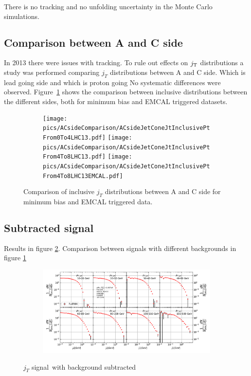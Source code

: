There is no tracking and no unfolding uncertainty in the Monte Carlo simulations. 



\subsection{Comparison between A and C side}
In 2013 there were issues with tracking. To rule out effects on $j_{\rm T}$ distributions a study was performed comparing $j_T$ distributions between A and C side. {\color{red}Which is lead going side and which is proton going} No systematic differences were observed. Figure~\ref{fig:signalbg} shows the comparison between inclusive distributions between the different sides, both for minimum bias and EMCAL triggered datasets.

\begin{figure}
\centering
\begin{subfigure}{0.95\textwidth}
\texttt{[image: pics/ACsideComparison/ACsideJetConeJtInclusivePtFrom0To4LHC13.pdf]}
\texttt{[image: pics/ACsideComparison/ACsideJetConeJtInclusivePtFrom4To8LHC13.pdf]}
\texttt{[image: pics/ACsideComparison/ACsideJetConeJtInclusivePtFrom4To8LHC13EMCAL.pdf]}
\end{subfigure}
\caption{Comparison of inclusive $j_T$ distributions between A and C side for minimum bias and EMCAL triggered data.}
\label{fig:signalbg}
\end{figure}

\subsection{Subtracted signal}
Results in figure \ref{fig:signal}. Comparison between signals with different backgrounds in figure \ref{fig:signalbg}
\begin{figure}
\centering
\begin{subfigure}{0.95\textwidth}
\includegraphics[width=\textwidth]{results/MixedFullJetsR04JetConeJtSignal.pdf}
\end{subfigure}
\caption{$j_T$ signal with background subtracted}
\label{fig:signal}
\end{figure}


